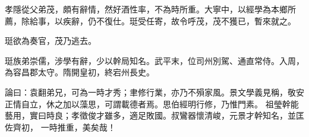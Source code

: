 \begin{pinyinscope}
 孝隱從父弟茂，頗有辭情，然好酒性率，不為時所重。大寧中，以經學為本鄉所薦，除給事，以疾辭，仍不復仕。珽受任寄，故令呼茂，茂不獲已，暫來就之。



 珽欲為奏官，茂乃逃去。



 珽族弟崇儒，涉學有辭，少以幹局知名。武平末，位司州別駕、通直常侍。入周，為容昌郡太守。隋開皇初，終宕州長史。



 論曰：袁翻弟兄，可為一時才秀；聿修行業，亦乃不殞家風。景文學義見稱，敬安正情自立，休之加以藻思，可謂載德者焉。思伯經明行修，乃惟門素。
 祖瑩幹能藝用，實曰時良；孝徵俊才雖多，適足敗國。叔鸞器懷清峻，元景才幹知名，並匡佐齊初，
 一時推重，美矣哉！



\end{pinyinscope}